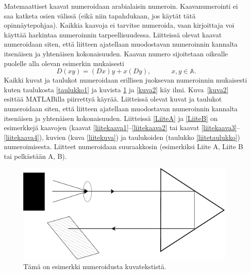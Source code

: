 \documentclass[finnish, 12pt, a4paper, elec, utf8, a-1b, online]{aaltothesis}
\begin{document}
Matemaattiset kaavat numeroidaan arabialaisin
numeroin. Kaavanumerointi ei saa katketa osien välissä (eikä niin
tapahdukaan, jos käytät tätä opinnäytepohjaa). Kaikkia kaavoja ei tarvitse
numeroida, vaan kirjoittaja voi käyttää harkintaa numeroinnin
tarpeellisuudessa.  Liitteissä olevat kaavat numeroidaan siten, että
liitteen ajatellaan muodostavan numeroinnin kannalta itsenäisen ja
yhtenäisen kokonaisuuden. Kaavan numero sijoitetaan oikealle puolelle
alla olevan esimerkin mukaisesti
\begin{equation}
D(xy) = (Dx)y + x(Dy),  \hspace{3em} x,y \in \mathbb{A}.
\end{equation}
Kaikki kuvat ja taulukot numeroidaan erillisen juoksevan numeroinnin
mukaisesti kuten taulukosta \ref{taulukko1} ja kuvista \ref{kuva1} ja
\ref{kuva2} käy ilmi. Kuva~\ref{kuva2} esittää MATLABilla piirrettyä käyrää.
Liitteissä olevat kuvat ja taulukot numeroidaan siten, että
liitteen ajatellaan muodostavan numeroinnin kannalta itsenäisen ja
yhtenäisen kokonaisuuden. Liitteissä \ref{LiiteA} ja \ref{LiiteB} on
esimerkkejä kaavojen (kaavat \ref{liitekaava1}--\ref{liitekaava2} tai
kaavat \ref{liitekaava3}--\ref{liitekaava4}), kuvien (kuva
\ref{liitekuva}) ja taulukoiden (taulukko \ref{liitetaulukko})
numeroimisesta.  Liitteet numeroidaan suuraakkosin (esimerkiksi Liite
A, Liite B tai pelkästään A, B).
\begin{figure}[htb]
\centering
\includegraphics[height=5cm]{images/linediagram.pdf}
\caption{Tämä on esimerkki numeroidusta kuvatekstistä. \label{kuva1}}
\end{figure}
\end{document}
